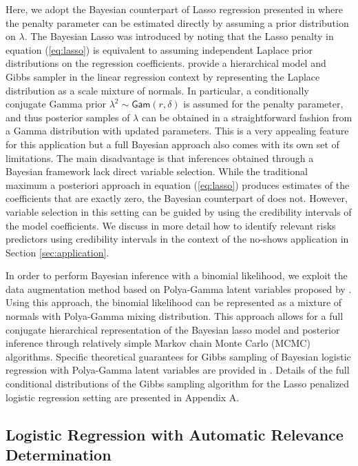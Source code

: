 \documentclass[twoside,11pt]{article}
\newcommand{\Gam}{\mathsf{Gam}}
\begin{document}
Here, we adopt the Bayesian counterpart of Lasso regression presented in \cite{ParkCasella08} where the penalty parameter can be estimated directly by assuming a prior distribution on $\lambda$. The Bayesian Lasso was introduced by noting that the Lasso penalty in equation (\ref{eq:lasso}) is equivalent to assuming independent Laplace prior distributions on the regression coefficients. \cite{ParkCasella08} provide a hierarchical model and Gibbs sampler in the linear regression context by representing the Laplace distribution as a scale mixture of normals. In particular, a conditionally conjugate Gamma prior $\lambda^2 \sim \Gam(r,\delta)$ is assumed for the penalty parameter, and thus posterior samples of $\lambda$ can be obtained in a straightforward fashion from a Gamma distribution with updated parameters. This is a very appealing feature for this application but a full Bayesian approach also comes with its own set of limitations. The main disadvantage is that inferences obtained through a Bayesian framework lack direct variable selection. While the traditional maximum a posteriori approach in equation (\ref{eq:lasso}) produces estimates of the coefficients that are exactly zero, the Bayesian counterpart of \cite{ParkCasella08} does not. However, variable selection in this setting can be guided by using the credibility intervals of the model coefficients. We discuss in more detail how to identify relevant risks predictors using credibility intervals in the context of the no-shows application in Section \ref{sec:application}.

In order to perform Bayesian inference with a binomial likelihood, we exploit the data augmentation
method based on Polya-Gamma latent variables proposed by \cite{PolsonScott13}. Using this approach, the binomial likelihood can be represented as a mixture of
normals with Polya-Gamma mixing distribution. This approach allows for a full conjugate
hierarchical representation of the Bayesian lasso model and posterior inference through relatively simple Markov chain Monte Carlo (MCMC) algorithms. Specific theoretical guarantees for Gibbs sampling of Bayesian logistic regression with Polya-Gamma latent variables are provided in \cite{ChoiHobert13}. Details of the full conditional distributions of the Gibbs sampling algorithm for the Lasso penalized logistic regression setting are presented in Appendix A.

\subsection{Logistic Regression with Automatic Relevance Determination}
\end{document}
